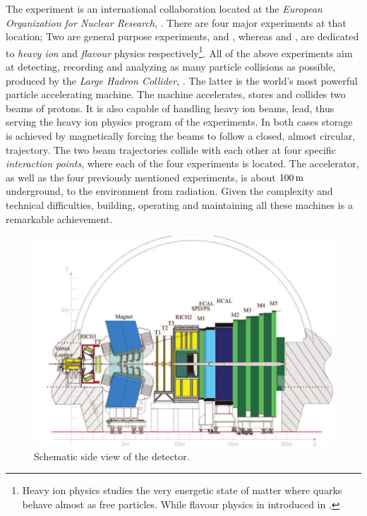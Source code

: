 
The \lhcb experiment is an international collaboration located at the {\it European Organization for Nuclear Research}, \cern.
There are four major experiments at that location; Two are general purpose experiments, \atlas and \cms, whereas
\alice and \lhcb, are dedicated to {\it heavy ion} and {\it flavour} physics respectively\footnote{Heavy ion physics
studies the very energetic state of matter where quarks behave almost as free particles. While flavour physics in introduced in .}.
All of the above experiments aim at detecting, recording and analyzing as many particle collisions
as possible, produced by the {\it Large Hadron Collider}, \lhc.
The latter is the world's most powerful particle accelerating machine.
The \lhc machine accelerates, stores and collides two beams of protons. It is also capable of handling
heavy ion beams, \eg lead, thus serving the heavy ion physics program of the experiments.
In both cases storage is achieved by magnetically forcing the beams to follow a closed, almost circular,
trajectory. The two beam trajectories collide with each other at four specific {\it interaction points},
where each of the four experiments is located. The \lhc accelerator, as well as the four previously
mentioned experiments, is about $100\rm \,m$ underground, to the environment from radiation.
Given the complexity and technical difficulties, building, operating and maintaining all these machines
is a remarkable achievement.

\begin{figure}[t]
  \centering
  \includegraphics[width=1\textwidth]{Figures/Chapter2/detector_cross_cmyk}
  \caption{Schematic side view of the \lhcb detector.}
  \label{lhcb_detector_cross_section}
\end{figure}

